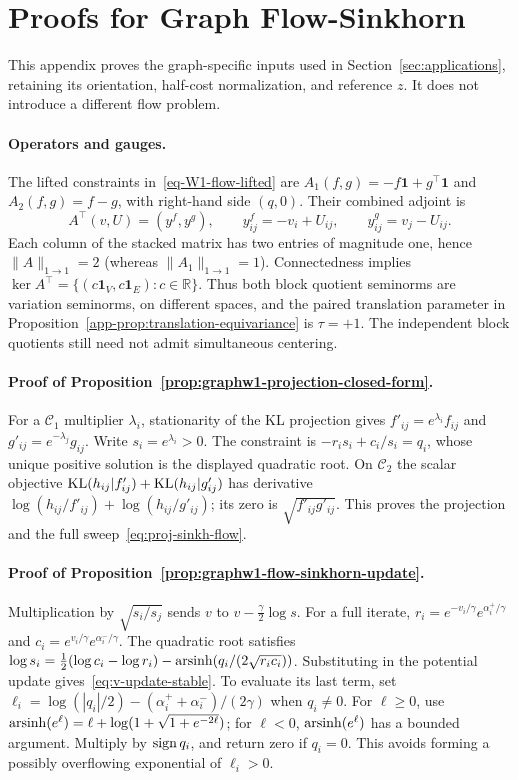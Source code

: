 \section{Proofs for Graph Flow-Sinkhorn}\label{app-app:w1-proofs}
This appendix proves the graph-specific inputs used in Section~\ref{sec:applications}, retaining its orientation, half-cost normalization, and reference $z$. It does not introduce a different flow problem.

\paragraph{Operators and gauges.}
The lifted constraints in~\eqref{eq-W1-flow-lifted} are $A_1(f,g)=-f\mathbf1+g^\top\mathbf1$ and $A_2(f,g)=f-g$, with right-hand side $(q,0)$. Their combined adjoint is
\begin{equation}\label{app-app-eq:At_action}
 A^\top(v,U)=(y^f,y^g),\qquad
 y^f_{ij}=-v_i+U_{ij},\qquad y^g_{ij}=v_j-U_{ij}.
\end{equation}
Each column of the stacked matrix has two entries of magnitude one, hence $\|A\|_{1\to1}=2$ (whereas $\|A_1\|_{1\to1}=1$). Connectedness implies $\ker A^\top=\{(c\mathbf1_V,c\mathbf1_E):c\in\mathbb R\}$. Thus both block quotient seminorms are variation seminorms, on different spaces, and the paired translation parameter in Proposition~\ref{app-prop:translation-equivariance} is $\tau=+1$. The independent block quotients still need not admit simultaneous centering.

\paragraph{Proof of Proposition~\ref{prop:graphw1-projection-closed-form}.}
For a $\mathcal C_1$ multiplier $\lambda_i$, stationarity of the KL projection gives $f'_{ij}=e^{\lambda_i}f_{ij}$ and $g'_{ij}=e^{-\lambda_j}g_{ij}$. Write $s_i=e^{\lambda_i}>0$. The constraint is $-r_is_i+c_i/s_i=q_i$, whose unique positive solution is the displayed quadratic root. On $\mathcal C_2$ the scalar objective $\mathrm{KL}(h_{ij}|f'_{ij})+\mathrm{KL}(h_{ij}|g'_{ij})$ has derivative $\log(h_{ij}/f'_{ij})+\log(h_{ij}/g'_{ij})$; its zero is $\sqrt{f'_{ij}g'_{ij}}$. This proves the projection and the full sweep~\eqref{eq:proj-sinkh-flow}.

\paragraph{Proof of Proposition~\ref{prop:graphw1-flow-sinkhorn-update}.}
Multiplication by $\sqrt{s_i/s_j}$ sends $v$ to $v-\frac\gamma2\log s$. For a full iterate, $r_i=e^{-v_i/\gamma}e^{\alpha_i^+/\gamma}$ and $c_i=e^{v_i/\gamma}e^{\alpha_i^-/\gamma}$. The quadratic root satisfies
$\log s_i=\tfrac12(\log c_i-\log r_i)-\operatorname{arsinh}(q_i/(2\sqrt{r_ic_i}))$.
Substituting in the potential update gives~\eqref{eq:v-update-stable}. To evaluate its last term, set $\ell_i=\log(|q_i|/2)-(\alpha_i^++\alpha_i^-)/(2\gamma)$ when $q_i\ne0$. For $\ell\geq0$, use $\operatorname{arsinh}(e^\ell)=\ell+\log(1+\sqrt{1+e^{-2\ell}})$; for $\ell<0$, $\operatorname{arsinh}(e^\ell)$ has a bounded argument. Multiply by $\operatorname{sign} q_i$, and return zero if $q_i=0$. This avoids forming a possibly overflowing exponential of $\ell_i>0$.

